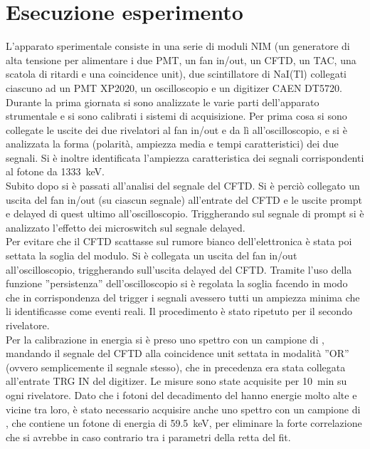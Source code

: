 \section{Esecuzione esperimento}
L'apparato sperimentale consiste in una serie di moduli NIM (un generatore di alta tensione per alimentare i due PMT, un fan in/out, un CFTD, un TAC, una scatola di ritardi e una coincidence unit), due scintillatore di NaI(Tl) collegati ciascuno ad un PMT XP2020, un oscilloscopio e un digitizer CAEN DT5720.\\

Durante la prima giornata si sono analizzate le varie parti dell'apparato strumentale e si sono calibrati i sistemi di acquisizione. Per prima cosa si sono collegate le uscite dei due rivelatori al fan in/out e da lì all'oscilloscopio, e si è analizzata la forma (polarità, ampiezza media e tempi caratteristici) dei due segnali. Si è inoltre identificata l'ampiezza caratteristica dei segnali corrispondenti al fotone da 1333~keV.\\

Subito dopo si è passati all'analisi del segnale del CFTD. Si è perciò collegato un uscita del fan in/out (su ciascun segnale) all'entrate del CFTD e le uscite prompt e delayed di quest ultimo all'oscilloscopio. Triggherando sul segnale di prompt si è analizzato l'effetto dei microswitch sul segnale delayed.\\

Per evitare che il CFTD scattasse sul rumore bianco dell'elettronica è stata poi settata la soglia del modulo. Si è collegata un uscita del fan in/out all'oscilloscopio, triggherando sull'uscita delayed del CFTD. Tramite l'uso della funzione ''persistenza'' dell'oscilloscopio si è regolata la soglia facendo in modo che in corrispondenza del trigger i segnali avessero tutti un ampiezza minima che li identificasse come eventi reali. Il procedimento è stato ripetuto per il secondo rivelatore.\\

Per la calibrazione in energia si è preso uno spettro con un campione di , mandando il segnale del CFTD alla coincidence unit settata in modalità ''OR'' (ovvero semplicemente il segnale stesso), che in precedenza era stata collegata all'entrate TRG IN del digitizer. Le misure sono state acquisite per 10~min su ogni rivelatore. Dato che i fotoni del decadimento del  hanno energie molto alte e vicine tra loro, è stato necessario acquisire anche uno spettro con un campione di , che contiene un fotone di energia di 59.5~keV, per eliminare la forte correlazione che si avrebbe in caso contrario tra i parametri della retta del fit.\\

